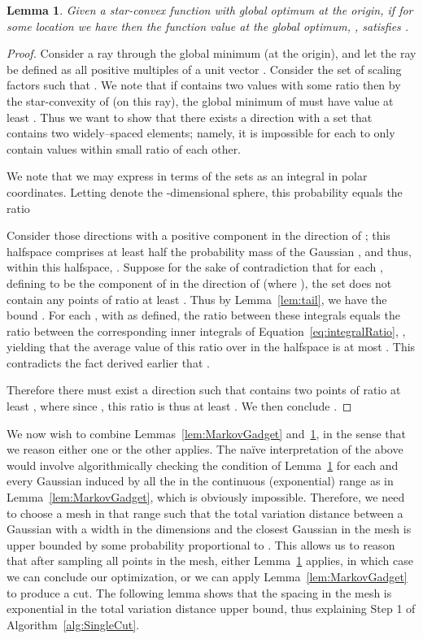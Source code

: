 \documentclass[11pt,letter]{article}
\newcounter{nTheorems}
\numberwithin{nTheorems}{section}
\newtheorem{lemma}[nTheorems]{Lemma}
\begin{document}
\begin{lemma}
\label{lem:Victory}
Given a star-convex function  with global optimum at the origin, if for some location  we have  then
the function value at the global optimum, , satisfies .

\end{lemma}
\begin{proof}
  Consider a ray through the global minimum (at the origin), and let the ray be defined as all positive multiples of a unit vector . Consider the set  of scaling factors  such that . We note that if  contains two values  with some ratio  then by the star-convexity of  (on this ray), the global minimum of  must have value at least . Thus we want to show that there exists a direction  with a set  that contains two widely--spaced elements; namely, it is impossible for each  to only contain values within small ratio of each other.

  We note that we may express  in terms of the sets  as an integral in polar coordinates. Letting  denote the -dimensional sphere, this probability equals the ratio
  
  Consider those directions  with a positive component in the direction of ; this halfspace  comprises at least half the probability mass of the Gaussian , and thus, within this halfspace, . Suppose for the sake of contradiction that for each , defining   to be the component of  in the direction of  (where ), the set  does not contain any points of ratio at least . Thus by Lemma~\ref{lem:tail}, we have the bound . For each , with  as defined, the ratio between these integrals equals the ratio between the corresponding inner integrals of Equation~\ref{eq:integralRatio}, , yielding that the average value of this ratio over  in the halfspace  is at most . This contradicts the fact derived earlier that .

  Therefore there must exist a direction  such that  contains two points of ratio at least , where since , this ratio is thus at least . We then conclude .
\end{proof}

We now wish to combine Lemmas~\ref{lem:MarkovGadget} and~\ref{lem:Victory}, in the sense that we reason either one or the other applies.
The na\"{i}ve interpretation of the above would involve algorithmically checking the condition of Lemma~\ref{lem:Victory} for each and every Gaussian induced by all the  in the continuous (exponential) range as in Lemma~\ref{lem:MarkovGadget}, which is obviously impossible.
Therefore, we need to choose a mesh in that range such that the total variation distance between a Gaussian with a width  in the  dimensions and the closest Gaussian in the mesh is upper bounded by some probability proportional to .
This allows us to reason that after sampling all points in the mesh, either Lemma~\ref{lem:Victory} applies, in which case we can conclude our optimization, or we can apply Lemma~\ref{lem:MarkovGadget} to produce a cut.
The following lemma shows that the spacing in the mesh is exponential in the total variation distance upper bound, thus explaining Step 1 of Algorithm~\ref{alg:SingleCut}.
\end{document}
